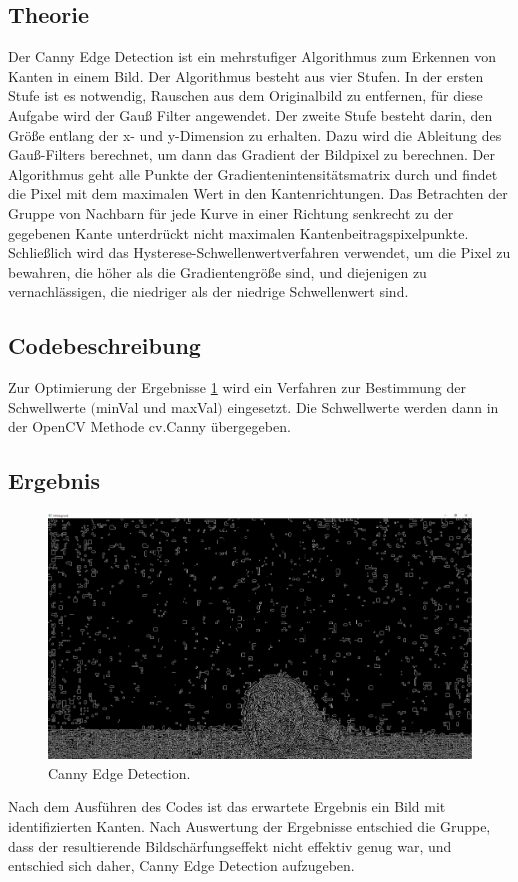 \documentclass[12pt]{scrartcl}
\begin{document}
\subsection{Theorie}
Der Canny Edge Detection ist ein mehrstufiger Algorithmus zum Erkennen von Kanten in einem Bild. Der Algorithmus besteht aus vier Stufen. In der ersten Stufe ist es notwendig, Rauschen aus dem Originalbild zu entfernen, f\"ur diese Aufgabe wird der Gau{\ss} Filter angewendet. Der zweite Stufe besteht darin, den Gr\"o{\ss}e entlang der x- und y-Dimension zu erhalten. Dazu wird die Ableitung des Gau{\ss}-Filters berechnet, um dann das Gradient der Bildpixel zu berechnen.
Der Algorithmus geht alle Punkte der Gradientenintensit\"atsmatrix durch und findet die Pixel mit dem maximalen Wert in den Kantenrichtungen.
Das Betrachten der Gruppe von Nachbarn f\"ur jede Kurve in einer Richtung senkrecht zu der gegebenen Kante unterdr\"uckt nicht maximalen Kantenbeitragspixelpunkte. Schlie{\ss}lich wird das Hysterese-Schwellenwertverfahren verwendet, um die Pixel zu bewahren, die h\"oher als die Gradientengr\"o{\ss}e sind, und diejenigen zu vernachl\"assigen, die niedriger als der niedrige Schwellenwert sind.
\subsection{Codebeschreibung}
Zur Optimierung der Ergebnisse \ref{fig:CED} wird ein Verfahren zur Bestimmung der Schwellwerte $($minVal und maxVal$)$ eingesetzt. Die Schwellwerte werden dann in der OpenCV Methode cv.Canny \"ubergegeben.\\
\subsection{Ergebnis}
\begin{figure}
  \includegraphics[width=\linewidth]{CED.png}
  \caption{Canny Edge Detection.}
  \label{fig:CED}
\end{figure}
Nach dem Ausf\"uhren des Codes ist das erwartete Ergebnis ein Bild mit identifizierten Kanten. Nach Auswertung der Ergebnisse entschied die Gruppe, dass der resultierende Bildsch\"arfungseffekt nicht effektiv genug war, und entschied sich daher, Canny Edge Detection aufzugeben.\\
\end{document}
